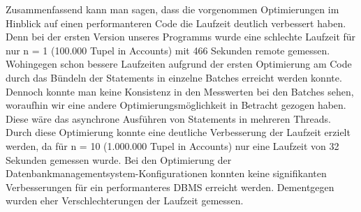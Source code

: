 Zusammenfassend kann man sagen, dass die vorgenommen Optimierungen im Hinblick auf einen performanteren Code die Laufzeit deutlich verbessert haben.
Denn bei der ersten Version unseres Programms wurde eine schlechte Laufzeit für nur n = 1 (100.000 Tupel in Accounts) mit 466 Sekunden remote gemessen.
Wohingegen schon bessere Laufzeiten aufgrund der ersten Optimierung am Code durch das Bündeln der Statements in einzelne Batches erreicht werden konnte.
Dennoch konnte man keine Konsistenz in den Messwerten bei den Batches sehen, woraufhin wir eine andere Optimierungsmöglichkeit in Betracht gezogen haben.
Diese wäre das asynchrone Ausführen von Statements in mehreren Threads.
Durch diese Optimierung konnte eine deutliche Verbesserung der Laufzeit erzielt werden, da für n = 10 (1.000.000 Tupel in Accounts) nur eine Laufzeit von 32 Sekunden gemessen wurde.
Bei den Optimierung der Datenbankmanagementsystem-Konfigurationen konnten keine signifikanten Verbesserungen für ein performanteres DBMS erreicht werden.
Dementgegen wurden eher Verschlechterungen der Laufzeit gemessen.